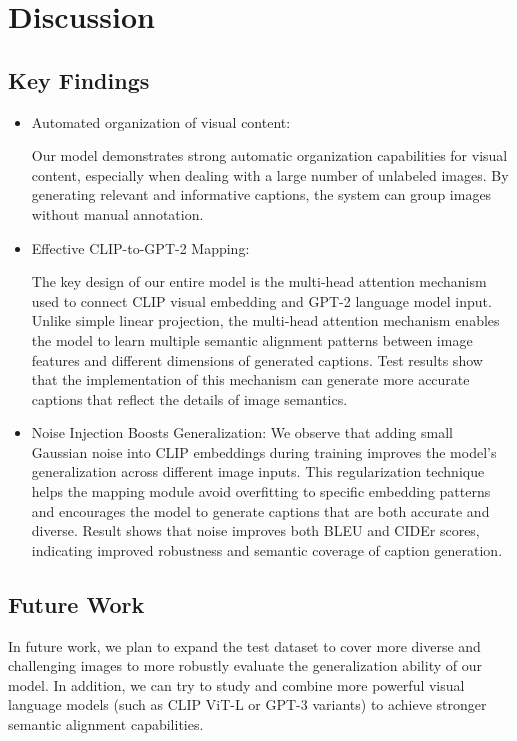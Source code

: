 \documentclass[11pt]{article}
\begin{document}
\section{Discussion}

\subsection{Key Findings}
\begin{itemize}
    \item Automated organization of visual content: 
    
    Our model demonstrates strong automatic organization 
    capabilities for visual content, especially when dealing 
    with a large number of unlabeled images. By generating 
    relevant and informative captions, the system can group 
    images without manual annotation.

        \item Effective CLIP-to-GPT-2 Mapping:
  
    The key design of our entire model is the multi-head 
    attention mechanism used to connect CLIP visual embedding
    and GPT-2 language model input. Unlike simple linear projection, 
    the multi-head attention mechanism enables the model to learn 
    multiple semantic alignment patterns between image features and 
    different dimensions of generated captions. Test results show 
    that the implementation of this mechanism can generate more 
    accurate captions that reflect the details of image semantics.

    \item Noise Injection Boosts Generalization:
    We observe that adding small Gaussian noise into CLIP embeddings 
    during training improves the model's generalization across 
    different image inputs. This regularization technique helps 
    the mapping module avoid overfitting to specific embedding 
    patterns and encourages the model to generate captions that
    are both accurate and diverse. Result shows that noise
    improves both BLEU and CIDEr scores, indicating improved
    robustness and semantic coverage of caption generation.
    
\end{itemize}

\subsection{Future Work}
In future work, we plan to expand the test 
dataset to cover more diverse and challenging images to 
more robustly evaluate the generalization ability of our model. 
In addition, we can try to study and combine more powerful visual 
language models (such as CLIP ViT-L or GPT-3 variants) to achieve 
stronger semantic alignment capabilities.
\end{document}

